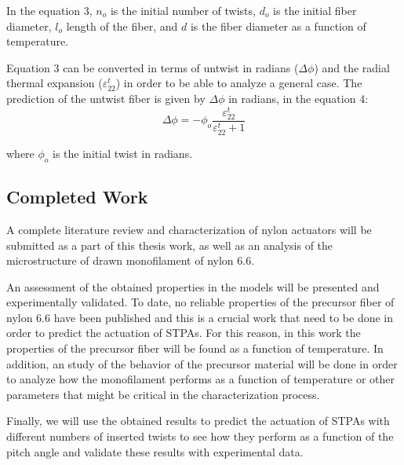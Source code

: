 \documentclass[12pt,oneside]{article}
\begin{document}
In the equation 3, $n_o$ is the initial number of twists, $d_o$ is the initial fiber diameter, $l_o$ length of the fiber, and $d$ is the fiber diameter as a function of temperature.

Equation 3 can be converted in terms of untwist in radians ($\Delta \phi$) and the radial thermal expansion ($\varepsilon^{t}_{22}$) in order to be able to analyze a general case. The prediction of the untwist fiber is given by $\Delta \phi$ in radians, in the equation 4:
\begin{equation}
\Delta \phi = -\phi_o \frac{\varepsilon^{t}_{22}}{\varepsilon^{t}_{22}+1} 
\label{eq:aziz_mod_e22}
\end{equation}

where $\phi_o$ is the initial twist in radians.


	


\subsection*{Completed Work}
\hspace{0.4cm} A complete literature review and characterization of nylon actuators will be submitted as a part of this thesis work, as well as an analysis of the microstructure of drawn monofilament of nylon 6.6.\par


An assessment of the obtained properties in the models will be presented and experimentally validated. To date, no reliable properties of the precursor fiber of nylon 6.6 have been published and this is a crucial work that need to be done in order to predict the actuation of STPAs. For this reason, in this work the properties of the precursor fiber will be found as a  function of temperature. In addition, an study of the behavior of the precursor material will be done in order to analyze how the monofilament performs as a function of temperature or other parameters that might be critical in the characterization process. \par

Finally, we will use the obtained results to predict the actuation of STPAs with different numbers of inserted twists to see how they perform as a function of the pitch angle and validate these results with experimental data.
\end{document}

